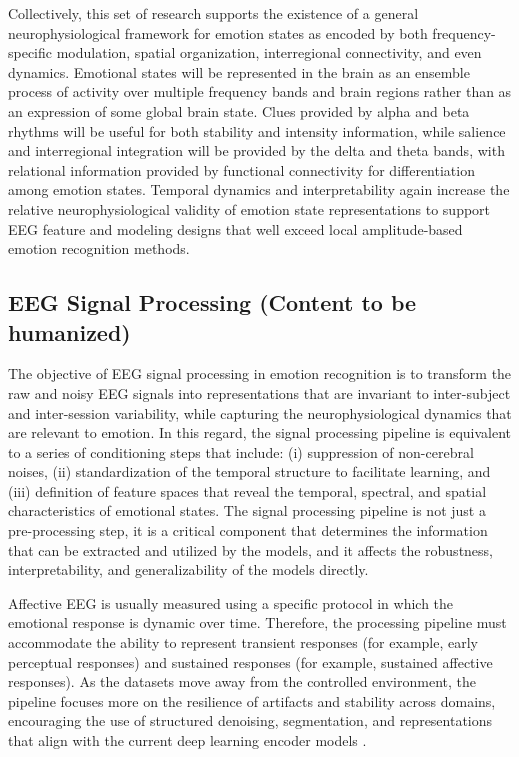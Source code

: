 \documentclass{WileyMSP-template}
\begin{document}
Collectively, this set of research supports the existence of a general neurophysiological framework for emotion states as encoded by both frequency-specific modulation, spatial organization, interregional connectivity, and even dynamics. Emotional states will be represented in the brain as an ensemble process of activity over multiple frequency bands and brain regions rather than as an expression of some global brain state. Clues provided by alpha and beta rhythms will be useful for both stability and intensity information, while salience and interregional integration will be provided by the delta and theta bands, with relational information provided by functional connectivity for differentiation among emotion states. Temporal dynamics and interpretability again increase the relative neurophysiological validity of emotion state representations to support EEG feature and modeling designs that well exceed local amplitude-based emotion recognition methods.

\subsection{EEG Signal Processing (Content to be humanized)}
The objective of EEG signal processing in emotion recognition is to transform the raw and noisy EEG signals into representations that are invariant to inter-subject and inter-session variability, while capturing the neurophysiological dynamics that are relevant to emotion. In this regard, the signal processing pipeline is equivalent to a series of conditioning steps that include: (i) suppression of non-cerebral noises, (ii) standardization of the temporal structure to facilitate learning, and (iii) definition of feature spaces that reveal the temporal, spectral, and spatial characteristics of emotional states. The signal processing pipeline is not just a pre-processing step, it is a critical component that determines the information that can be extracted and utilized by the models, and it affects the robustness, interpretability, and generalizability of the models directly.

Affective EEG is usually measured using a specific protocol in which the emotional response is dynamic over time. Therefore, the processing pipeline must accommodate the ability to represent transient responses (for example, early perceptual responses) and sustained responses (for example, sustained affective responses). As the datasets move away from the controlled environment, the pipeline focuses more on the resilience of artifacts and stability across domains, encouraging the use of structured denoising, segmentation, and representations that align with the current deep learning encoder models \cite{rahman2021eegreview}.
\end{document}

